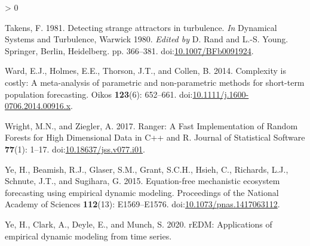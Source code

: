 \documentclass[
]{article}
\newlength{\cslhangindent}
\newenvironment{CSLReferences}[2] %
 {%
  \setlength{\parindent}{0pt}
  \ifodd #1 \everypar{\setlength{\hangindent}{\cslhangindent}}\ignorespaces\fi
  \ifnum #2 > 0
  \setlength{\parskip}{#2\baselineskip}
  \fi
 }%
 {}
\begin{document}
\begin{CSLReferences}{1}{0}
\leavevmode\hypertarget{ref-takens1981}{}%
Takens, F. 1981. Detecting strange attractors in turbulence. \emph{In} Dynamical {Systems} and {Turbulence}, {Warwick} 1980. \emph{Edited by} D. Rand and L.-S. Young. {Springer}, {Berlin, Heidelberg}. pp. 366--381. doi:\href{https://doi.org/10.1007/BFb0091924}{10.1007/BFb0091924}.

\leavevmode\hypertarget{ref-ward2014}{}%
Ward, E.J., Holmes, E.E., Thorson, J.T., and Collen, B. 2014. Complexity is costly: A meta-analysis of parametric and non-parametric methods for short-term population forecasting. Oikos \textbf{123}(6): 652--661. doi:\href{https://doi.org/10.1111/j.1600-0706.2014.00916.x}{10.1111/j.1600-0706.2014.00916.x}.

\leavevmode\hypertarget{ref-wright2017}{}%
Wright, M.N., and Ziegler, A. 2017. Ranger: {A Fast Implementation} of {Random Forests} for {High Dimensional Data} in {C}++ and {R}. Journal of Statistical Software \textbf{77}(1): 1--17. doi:\href{https://doi.org/10.18637/jss.v077.i01}{10.18637/jss.v077.i01}.

\leavevmode\hypertarget{ref-ye2015}{}%
Ye, H., Beamish, R.J., Glaser, S.M., Grant, S.C.H., Hsieh, C., Richards, L.J., Schnute, J.T., and Sugihara, G. 2015. Equation-free mechanistic ecosystem forecasting using empirical dynamic modeling. Proceedings of the National Academy of Sciences \textbf{112}(13): E1569--E1576. doi:\href{https://doi.org/10.1073/pnas.1417063112}{10.1073/pnas.1417063112}.

\leavevmode\hypertarget{ref-ye2020}{}%
Ye, H., Clark, A., Deyle, E., and Munch, S. 2020. rEDM: Applications of empirical dynamic modeling from time series.

\end{CSLReferences}
\end{document}
